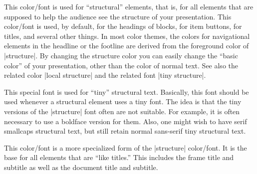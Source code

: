 \begin{itemize}
  \no\yes\yes
  This color/font is used for ``structural'' elements, that is, for
  all elements that are supposed to help the audience see the
  structure of your presentation. This color/font is used, by default,
  for the headings of blocks, for item buttons, for titles, and
  several other things. In most color themes, the colors for
  navigational elements in the headline or the footline are derived
  from the foreground color of |structure|. By changing the structure
  color you can easily change the ``basic color'' of your
  presentation, other than the color of normal text. See also the
  related color |local structure| and the related font
  |tiny structure|. 

  \no\no\yes
  This special font is used for ``tiny'' structural text. Basically,
  this font should be used whenever a structural element uses a tiny
  font. The idea is that the tiny versions of the |structure| font
  often are not suitable. For example, it is often necessary to use a
  boldface version for them. Also, one might wish to have serif smallcaps
  structural text, but still retain normal sans-serif tiny structural
  text. 

  \no\yes\yes
  This color/font is a more specialized form of the |structure|
  color/font. It is the base for all elements that are ``like
  titles.'' This includes the frame title and subtitle as well as the
  document title and subtitle.
\end{itemize}









